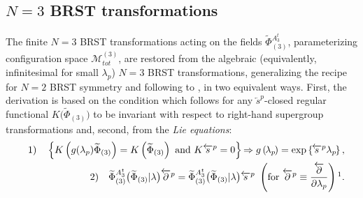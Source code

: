 \documentclass[10pt]{article}
\begin{document}
\subsection{$N=3$ BRST transformations} \label{N=3gauge}

The finite $N=3$ BRST transformations acting on the fields $\widetilde{\Phi}{}^{A^t_3}_{(3)}$, parameterizing  configuration space $\mathcal{M}^{(3)}_{tot}$, are restored
from the algebraic (equivalently, infinitesimal for small $\lambda_p$) $N=3$ BRST transformations, generalizing the recipe \cite{re1} for
$N=2$ BRST symmetry and following to  \cite{UMR}, \cite{BLTf} %
 in two equivalent ways. First,  the derivation   is based on the condition which follows  for any
$\overleftarrow{s}^{p }$-closed regular functional $K\big(\widetilde{\Phi}_{(3)} \big)$
to be invariant with respect to right-hand supergroup transformations  and, second,  from
the \emph{Lie equations}:
\begin{eqnarray}
&&1) \quad \left\{ K\left( g(\lambda_p)\widetilde{\Phi}_{(3)} \right) =K\left( \widetilde{\Phi}_{(3)}
\right) \ \mathrm{and}\ K\overleftarrow{s}{}^{p}=0\right\} \hspace{-0.1em}%
\Rightarrow g\left( \hspace{-0.1em}\lambda_{p}\hspace{-0.1em}\right) = \exp \left\{ \hspace{-0.1em}\overleftarrow{s%
}{}^{p}\lambda_{p}\hspace{-0.1em}\right\} ,  \label{bab3}
\\
&&2) \quad   \widetilde{\Phi}{}^{A^t_3}_{(3)} \big(\widetilde{\Phi}_{(3)}|\lambda \big)\overleftarrow{\partial }^{p} =\widetilde{\Phi}{}^{A^t_3}_{(3)}\big(\widetilde{\Phi}_{(3)}|\lambda\big)%
\overleftarrow{s}^{p}\ \left( \mathrm{for}\ \overleftarrow{\partial }%
^{p}\equiv \frac{\overleftarrow{\partial }}{\partial \lambda_{p}}\right)\footnotemark .
\label{Lieeq}
\end{eqnarray}
\end{document}
